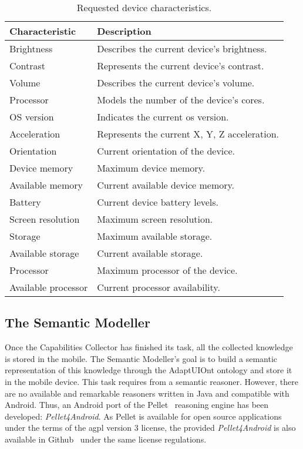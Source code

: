 \begin{table}[H]
  \caption{Requested device characteristics.}
 \label{tbl:device_characteristics}
\footnotesize
\centering
 \begin{tabular}{l l}
  \hline 
  \textbf{Characteristic}& \textbf{Description}				\\
  \hline
  Brightness		& Describes the current device’s brightness.	\\
  Contrast		& Represents the current device’s contrast.	\\
  Volume		& Describes the current device’s volume.	\\
  Processor		& Models the number of the device’s cores.	\\
  OS version		& Indicates the current	\ac{os} version.	\\
  Acceleration		& Represents the current X, Y, Z acceleration.	\\
  Orientation		& Current orientation of the device.		\\
  Device memory		& Maximum device memory.			\\
  Available memory	& Current available device memory.		\\
  Battery		& Current device battery levels.		\\
  Screen resolution	& Maximum screen resolution.			\\
  Storage		& Maximum available storage.			\\
  Available storage	& Current available storage.			\\
  Processor		& Maximum processor of the device.		\\
  Available processor	& Current processor availability.		\\
  \hline
\end{tabular}
\end{table}


\subsection{The Semantic Modeller}
\label{sec:semantic_modeller}

Once the Capabilities Collector has finished its task, all the collected
knowledge is stored in the mobile. The Semantic Modeller's goal is to build a 
semantic representation of this knowledge through the AdaptUIOnt ontology and
store it in the mobile device. This task requires from a semantic reasoner. 
However, there are no available and remarkable reasoners written in Java and 
compatible with Android. Thus, an Android port of the 
Pellet~\citep{pellet} reasoning engine has been
developed: \textit{Pellet4Android}. As Pellet is available for open source
applications under the terms of the \ac{agpl} version 3 license, the provided
\textit{Pellet4Android} is also available in Github~\citep{pellet4android}
under the same license regulations.

